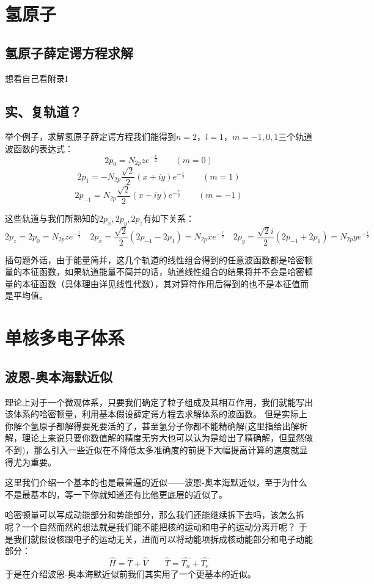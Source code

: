 \section{氢原子}
\subsection{氢原子薛定谔方程求解}
想看自己看附录I

\subsection{实、复轨道？}
举个例子，求解氢原子薛定谔方程我们能得到$n=2$，$l=1$，$m=-1,0,1$三个轨道波函数的表达式：
\[2p_0=N_{2p}ze^{-\frac{r}{2}} \qquad (m=0)\]
\[2p_1=-N_{2p}\frac{\sqrt{2}}{2}(x+iy)e^{-\frac{r}{2}} \qquad (m=1) \]
\[2p_{-1}=N_{2p}\frac{\sqrt{2}}{2}(x-iy)e^{-\frac{r}{2}} \qquad (m=-1) \]

这些轨道与我们所熟知的$2p_x,2p_y,2p_z$有如下关系：
\[2p_z=2p_0=N_{2p}ze^{-\frac{r}{2}} \quad 2p_x=\frac{\sqrt{2}}{2}(2p_{-1}-2p_1)=N_{2p}xe^{-\frac{r}{2}} \quad 2p_y=\frac{\sqrt{2}i}{2}(2p_{-1}+2p_1)=N_{2p}ye^{-\frac{r}{2}}\]

插句题外话，由于能量简并，这几个轨道的线性组合得到的任意波函数都是哈密顿量的本征函数，如果轨道能量不简并的话，轨道线性组合的结果将并不会是哈密顿量的本征函数（具体理由详见线性代数），其对算符作用后得到的也不是本征值而是平均值。

\section{单核多电子体系}
\subsection{波恩-奥本海默近似}
理论上对于一个微观体系，只要我们确定了粒子组成及其相互作用，我们就能写出该体系的哈密顿量，利用基本假设薛定谔方程去求解体系的波函数。
但是实际上你解个氢原子都解得要死要活的了，甚至氢分子你都不能精确解(这里指给出解析解，理论上来说只要你数值解的精度无穷大也可以认为是给出了精确解，但显然做不到)，那么引入一些近似在不降低太多准确度的前提下大幅提高计算的速度就显得尤为重要。

这里我们介绍一个基本的也是最普遍的近似——波恩-奥本海默近似，至于为什么不是最基本的，等一下你就知道还有比他更底层的近似了。

哈密顿量可以写成动能部分和势能部分，那么我们还能继续拆下去吗，该怎么拆呢？一个自然而然的想法就是我们能不能把核的运动和电子的运动分离开呢？
于是我们就假设核跟电子的运动无关，进而可以将动能项拆成核动能部分和电子动能部分：
\[\hat{H}=\hat{T}+\hat{V} \qquad \hat{T}=\hat{T_n}+\hat{T_e}\]
于是在介绍波恩-奥本海默近似前我们其实用了一个更基本的近似。

